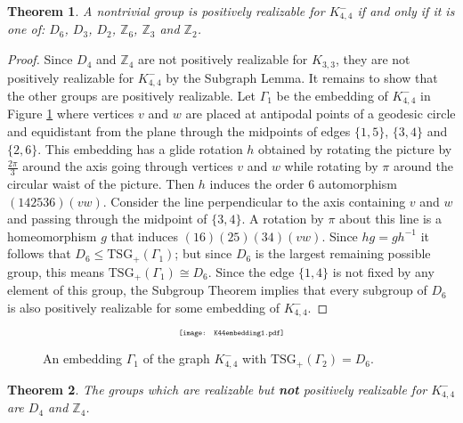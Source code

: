 \documentclass[11]{amsart}
\def\Z{\mathbb{Z}}
\def\TSG{{\mathrm{TSG}}}
\newtheorem{theorem}{Theorem}[section]
\theoremstyle{definition}
\theoremstyle{remark}
\begin{document}
\begin{theorem}\label{K44tsg}
A nontrivial group is positively realizable for $K_{4,4}^-$ if and only if it is one of:  $D_6$, $D_3$, $D_2$, $\mathbb{Z}_6$, $\Z_3$ and $\mathbb{Z}_2$.  \end{theorem}
\begin{proof}
Since $D_4$ and $\Z_4$ are not positively realizable for $K_{3,3}$, they are not positively realizable for $K_{4,4}^-$ by the Subgraph Lemma. It remains to show that the other groups are positively realizable. Let $\Gamma_1$ be the embedding of $K_{4,4}^-$ in Figure \ref{F:K44edgeD6} where vertices $v$ and $w$ are placed at antipodal points of a geodesic circle and equidistant from the plane through the midpoints of edges $\{1,5\}$, $\{3,4\}$ and $\{2,6\}$.  This embedding has a glide rotation $h$ obtained by rotating the picture by  $\frac{2\pi}{3}$ around the axis going through vertices $v$ and $w$ while rotating by $\pi$ around the circular waist of the picture.  Then $h$ induces the order $6$ automorphism $(142536)(vw)$.  Consider the line perpendicular to the axis containing $v$ and $w$ and passing through the midpoint of $\{3,4\}$.  A rotation by $\pi$ about this line is a homeomorphism $g$ that induces $(16)(25)(34)(vw)$.  Since $hg=gh^{-1}$ it follows that $D_6 \leq \TSG_+(\Gamma_1)$; but since $D_6$ is the largest remaining possible group, this means $\TSG_+(\Gamma_1) \cong D_6$.  Since the edge $\{1,4\}$ is not fixed by any element of this group, the Subgroup Theorem implies that every subgroup of $D_6$ is also positively realizable for some embedding of $K_{4,4}^-$. 
\end{proof}


    \begin{figure} [htbp]
$$\scalebox{.6}{\texttt{[image: K44embedding1.pdf]}}$$
\caption{An embedding $\Gamma_1$ of the graph $K_{4,4}^-$ with $ \TSG_+(\Gamma_2) = D_6$.}
\label{F:K44edgeD6}
\end{figure}


\begin{theorem} \label{T:K44edgeTSG2}
The groups which are realizable but {\bf not} positively realizable for $K_{4,4}^-$ are $D_4$ and $\Z_4$.
\end{theorem}
\end{document}
